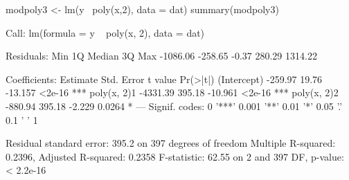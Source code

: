 \begin{Schunk}
\begin{Sinput}
 modpoly3 <- lm(y~ poly(x,2), data = dat)
 summary(modpoly3)
\end{Sinput}
\begin{Soutput}
Call:
lm(formula = y ~ poly(x, 2), data = dat)

Residuals:
     Min       1Q   Median       3Q      Max 
-1086.06  -258.65    -0.37   280.29  1314.22 

Coefficients:
            Estimate Std. Error t value Pr(>|t|)    
(Intercept)  -259.97      19.76 -13.157   <2e-16 ***
poly(x, 2)1 -4331.39     395.18 -10.961   <2e-16 ***
poly(x, 2)2  -880.94     395.18  -2.229   0.0264 *  
---
Signif. codes:  0 '***' 0.001 '**' 0.01 '*' 0.05 '.' 0.1 ' ' 1

Residual standard error: 395.2 on 397 degrees of freedom
Multiple R-squared:  0.2396,	Adjusted R-squared:  0.2358 
F-statistic: 62.55 on 2 and 397 DF,  p-value: < 2.2e-16
\end{Soutput}
\end{Schunk}
